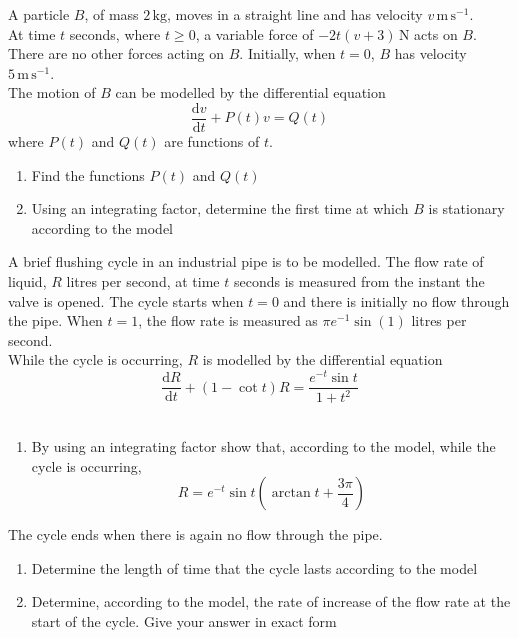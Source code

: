 \documentclass[leqno]{article}
\begin{document}
\begin{enumerate}[
  label=\textbf{\arabic*.},
  leftmargin=*,
  topsep=0pt,
  partopsep=0pt,
  parsep=0pt
]
A particle $B$, of mass $2\,\mathrm{kg}$, moves in a straight line and has velocity $v\,\mathrm{m\,s^{-1}}$. \\

At time $t$ seconds, where $t\ge 0$, a variable force of $-2t(v+3)\,\mathrm{N}$ acts on $B$. There are no other forces acting on $B$. Initially, when $t=0$, $B$ has velocity $5\,\mathrm{m\,s^{-1}}$. \\

The motion of $B$ can be modelled by the differential equation
\[
\frac{\mathrm{d}v}{\mathrm{d}t}+P(t)v=Q(t)
\]
where $P(t)$ and $Q(t)$ are functions of $t$. \\
\begin{enumerate}[label=\textbf{(\alph*)}]
  \item Find the functions $P(t)$ and $Q(t)$  \\
  \item Using an integrating factor, determine the first time at which $B$ is stationary according to the model  \\
\end{enumerate}

\newpage

\questionitem

A brief flushing cycle in an industrial pipe is to be modelled. The flow rate of liquid, $R$ litres per second, at time $t$ seconds is measured from the instant the valve is opened. The cycle starts when $t=0$ and there is initially no flow through the pipe. When $t=1$, the flow rate is measured as $\pi e^{-1}\sin (1)$ litres per second. \\

While the cycle is occurring, $R$ is modelled by the differential equation
\[
\frac{\mathrm{d}R}{\mathrm{d}t}+(1-\cot t)R=\frac{e^{-t}\sin t}{1+t^2}
\]\\
\begin{enumerate}[label=\textbf{(\alph*)}]
  \item By using an integrating factor show that, according to the model, while the cycle is occurring,
  \[
  R=e^{-t}\sin t\left(\arctan t+\frac{3\pi}{4}\right)
  \] 
\end{enumerate}
The cycle ends when there is again no flow through the pipe. \\
\begin{enumerate}[label=\textbf{(\alph*)}, resume]
  \item Determine the length of time that the cycle lasts according to the model  \\
  \item Determine, according to the model, the rate of increase of the flow rate at the start of the cycle. Give your answer in exact form  \\
\end{enumerate}


\end{enumerate}
\end{document}

